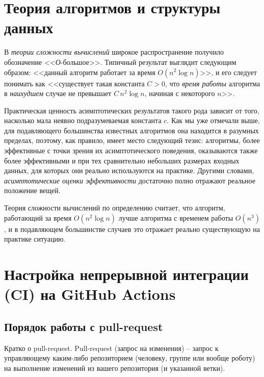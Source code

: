 \documentclass[%
	11pt,
	a4paper,
	utf8,
		]{article}
\begin{document}
\section{Теория алгоритмов и структуры данных}

В \emph{теории сложности вычислений} широкое распространение получило обозначение <<\emph{О}-большое>>. Типичный результат выглядит следующим образом: <<данный алгоритм работает за время $ O(n^2 \log n) $>>, и его следует понимать как <<существует такая константа $ C > 0 $, что \emph{время работы} алгоритма в \emph{наихудшем} случае не превышает $ C\,n^2 \log n $, начиная с некоторого $ n $>>.

Практическая ценность асимптотических результатов такого рода зависит от того, насколько мала неявно подразумеваемая константа $ c $. Как мы уже отмечали выше, для подавляющего большинства известных алгоритмов она находится в разумных пределах, поэтому, как правило, имеет место следующий тезис: алгоритмы, более эффективные с точки зрения их асимптотического поведения, оказываются также более эффективными и при тех сравнительно небольших размерах входных данных, для которых они реально используются на практике. Другими словами, \emph{асимптотические оценки эффективности} достаточно полно отражают реальное положение вещей.

Теория сложности вычислений по определению считает, что алгоритм, работающий за время $ O(n^2 \log n) $ лучше алгоритма с временем работы $ O(n^3) $, и в подавляющем большинстве случаев это отражает реально существующую на практике ситуацию.

\section{Настройка непрерывной интеграции (CI) на GitHub Actions}

\subsection{Порядок работы с pull-request}

Кратко о pull-request. Pull-request (запрос на изменения) -- запрос к управляющему каким-либо репозиторием (человеку, группе или вообще роботу) на выполнение изменений из вашего репозитория (и указанной ветки).
\end{document}
